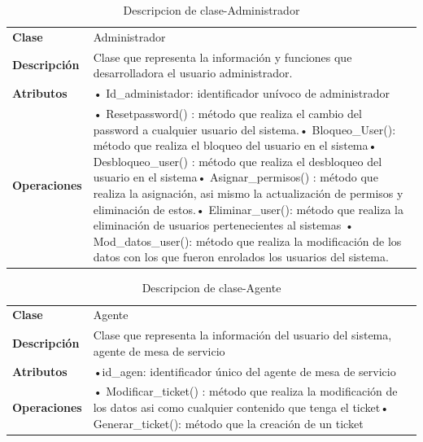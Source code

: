  
 \begin{table}[H]
 	\centering
 	\caption{Descripcion de clase-Administrador}
 	\begin{tabular}{|p{6.145em}|p{28.07em}|}
 		\toprule
 		\rowcolor[rgb]{ .125,  .216,  .392} \multicolumn{2}{|p{34.215em}|}{\textcolor[rgb]{ 1,  1,  1}{\textbf{Clase Administrador }}} \\
 		\midrule
 		\textbf{Clase} & \multicolumn{1}{l|}{Administrador } \\
 		\midrule
 		\textbf{Descripción} & Clase que representa la información y funciones que desarrolladora el usuario administrador. \\
 		\midrule
 		\textbf{Atributos } & •	Id\_administador: identificador unívoco de administrador \\
 		\midrule
 		\textbf{Operaciones} & •	Resetpassword() :  método que realiza el cambio del password a cualquier usuario del sistema.\newline{}•	Bloqueo\_User(): método que realiza el bloqueo del usuario en el sistema\newline{}•	Desbloqueo\_user() : método que realiza el desbloqueo del usuario en el sistema\newline{}•	Asignar\_permisos() : método que realiza la asignación, asi mismo la actualización de permisos y eliminación de estos.\newline{}•	Eliminar\_user(): método que realiza la eliminación de usuarios pertenecientes al sistemas \newline{}•	Mod\_datos\_user(): método que realiza la modificación de los datos con los que fueron enrolados los usuarios del sistema. \\
 		\bottomrule
 	\end{tabular}%
 	\label{tab:CLAS2}%
 \end{table}%
 
\begin{table}[H]
	\centering
	\caption{Descripcion de clase-Agente}
	\begin{tabular}{|p{6.145em}|p{28.07em}|}
		\toprule
		\rowcolor[rgb]{ .125,  .216,  .392} \multicolumn{2}{|p{34.215em}|}{\textcolor[rgb]{ 1,  1,  1}{\textbf{Clase Agente  }}} \\
		\midrule
		\textbf{Clase} & \multicolumn{1}{l|}{Agente  } \\
		\midrule
		\textbf{Descripción} & Clase que representa la información  del usuario del sistema, agente de mesa de servicio  \\
		\midrule
		\textbf{Atributos } & •id\_agen: identificador único del agente de mesa de servicio \\
		\midrule
		\textbf{Operaciones} & •	Modificar\_ticket()  :  método que realiza la modificación de los datos asi como cualquier contenido que tenga el ticket\newline{}•	Generar\_ticket(): método que la creación de un ticket \\
		\bottomrule
	\end{tabular}%
	\label{tab:CLAS3}%
\end{table}%


